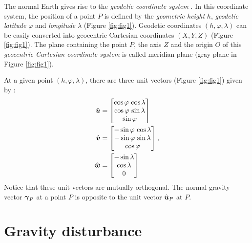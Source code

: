 \documentclass[extra]{gji}
\begin{document}
The normal Earth gives rise to the \textit{geodetic coordinate system}
\citep{heiskanen-moritz1967, soler1976, torge2012, bouman_etal2013}.
In this coordinate system, the position of a point $P$
is defined by the \textit{geometric height} $h$, 
\textit{geodetic latitude}
$\varphi$ and \textit{longitude} $\lambda$ (Figure \ref{fig:fig1}).
Geodetic coordinates $(h, \varphi, \lambda)$ can be easily 
converted into geocentric Cartesian coordinates $(X, Y, Z)$
(Figure \ref{fig:fig1}).
The plane containing the point $P$, the axis $Z$ and
the origin $O$ of this \textit{geocentric Cartesian coordinate system}
is called meridian plane (gray plane in Figure \ref{fig:fig1}).

At a given point $(h, \varphi, \lambda)$, there are three 
unit vectors (Figure \ref{fig:fig1}) given by \citep{soler1976}:
\begin{equation}
\begin{split}
\hat{\mitbf{u}} &= 
\begin{bmatrix}
\cos\varphi \, \cos\lambda \\
\cos\varphi \, \sin\lambda \\
\sin\varphi
\end{bmatrix} \\
\hat{\mitbf{v}} &= 
\begin{bmatrix}
-\sin\varphi \, \cos\lambda \\
-\sin\varphi \, \sin\lambda \\
\cos\varphi
\end{bmatrix} \\
\hat{\mitbf{w}} &= 
\begin{bmatrix}
-\sin\lambda \\
\cos\lambda \\
0
\end{bmatrix}
\end{split} \: ,
\label{eq:unit-vectors}
\end{equation}
Notice that these unit vectors are mutually orthogonal.
The normal gravity vector $\mitbf{\gamma}_{P}$ at a point $P$
is opposite to the unit vector $\hat{\mitbf{u}}_{P}$ at $P$.


\section{Gravity disturbance}
\end{document}
